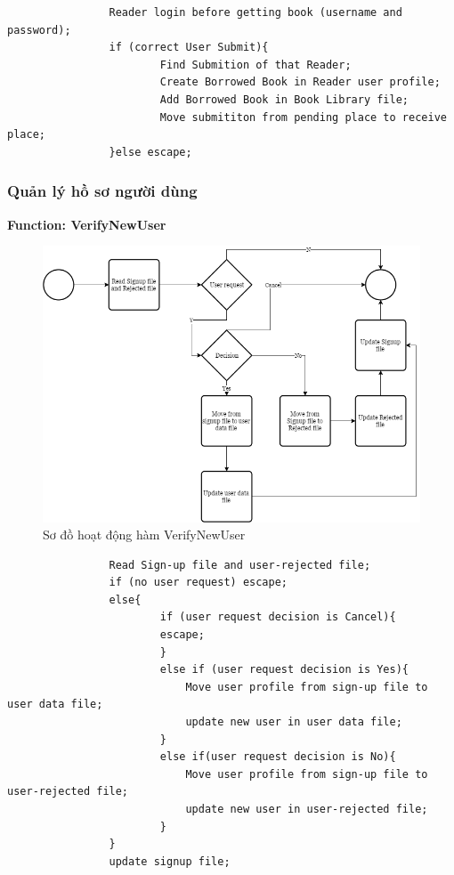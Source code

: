 \documentclass[12pt,a4paper]{report}
\begin{document}
                \begin{verbatim}
                Reader login before getting book (username and password);
                if (correct User Submit){
                        Find Submition of that Reader;
                        Create Borrowed Book in Reader user profile;
                        Add Borrowed Book in Book Library file;
                        Move submititon from pending place to receive place;
                }else escape;
                \end{verbatim}
            \newpage
            \subsubsection{Quản lý hồ sơ người dùng}
                \textbf{Function: VerifyNewUser}
                \begin{figure}[H]
                    \centering
                    \label{F:adduser}
                    \includegraphics[scale = .4]{adduser.png}
                    \caption{Sơ đồ hoạt động hàm VerifyNewUser}
                \end{figure}
                \begin{verbatim}
                Read Sign-up file and user-rejected file;
                if (no user request) escape;
                else{
                        if (user request decision is Cancel){
                        escape;
                        }
                        else if (user request decision is Yes){
                            Move user profile from sign-up file to user data file;
                            update new user in user data file;
                        }
                        else if(user request decision is No){
                            Move user profile from sign-up file to user-rejected file;
                            update new user in user-rejected file;
                        }
                }
                update signup file;
                \end{verbatim}
\end{document}
